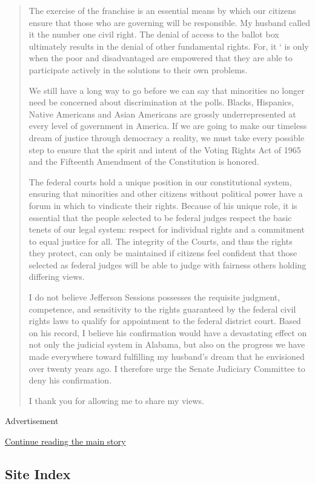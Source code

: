 \begin{quote}
The exercise of the franchise is an essential means by which our
citizens ensure that those who are governing will be responsible. My
husband called it the number one civil right. The denial of access to
the ballot box ultimately results in the denial of other fundamental
rights. For, it ` is only when the poor and disadvantaged are empowered
that they are able to participate actively in the solutions to their own
problems.

We still have a long way to go before we can say that minorities no
longer need be concerned about discrimination at the polls. Blacks,
Hispanics, Native Americans and Asian Americans are grossly
underrepresented at every level of government in America. If we are
going to make our timeless dream of justice through democracy a reality,
we must take every possible step to ensure that the spirit and intent of
the Voting Rights Act of 1965 and the Fifteenth Amendment of the
Constitution is honored.

The federal courts hold a unique position in our constitutional system,
ensuring that minorities and other citizens without political power have
a forum in which to vindicate their rights. Because of his unique role,
it is essential that the people selected to be federal judges respect
the basic tenets of our legal system: respect for individual rights and
a commitment to equal justice for all. The integrity of the Courts, and
thus the rights they protect, can only be maintained if citizens feel
confident that those selected as federal judges will be able to judge
with fairness others holding differing views.

I do not believe Jefferson Sessions possesses the requisite judgment,
competence, and sensitivity to the rights guaranteed by the federal
civil rights laws to qualify for appointment to the federal district
court. Based on his record, I believe his confirmation would have a
devastating effect on not only the judicial system in Alabama, but also
on the progress we have made everywhere toward fulfilling my husband's
dream that he envisioned over twenty years ago. I therefore urge the
Senate Judiciary Committee to deny his confirmation.

I thank you for allowing me to share my views.
\end{quote}

Advertisement

\protect\hyperlink{after-bottom}{Continue reading the main story}

\hypertarget{site-index}{%
\subsection{Site Index}\label{site-index}}

